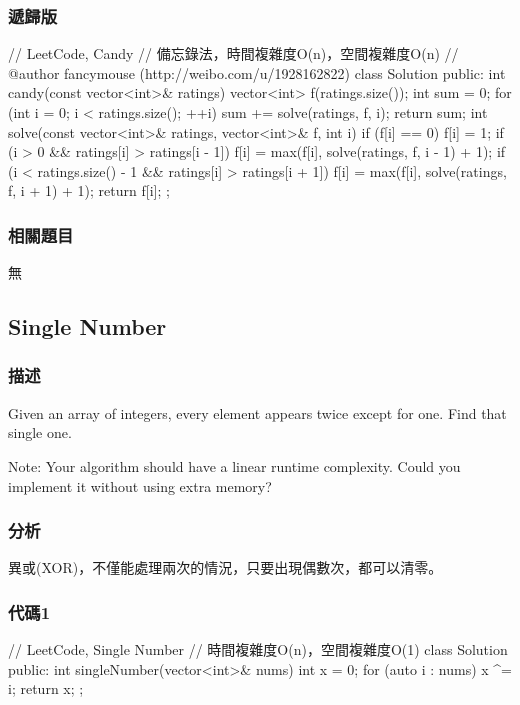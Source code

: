 \subsubsection{遞歸版}
\begin{Code}
// LeetCode, Candy
// 備忘錄法，時間複雜度O(n)，空間複雜度O(n)
// @author fancymouse (http://weibo.com/u/1928162822)
class Solution {
public:
    int candy(const vector<int>& ratings) {
        vector<int> f(ratings.size());
        int sum = 0;
        for (int i = 0; i < ratings.size(); ++i)
            sum += solve(ratings, f, i);
        return sum;
    }
    int solve(const vector<int>& ratings, vector<int>& f, int i) {
        if (f[i] == 0) {
            f[i] = 1;
            if (i > 0 && ratings[i] > ratings[i - 1])
                f[i] = max(f[i], solve(ratings, f, i - 1) + 1);
            if (i < ratings.size() - 1 && ratings[i] > ratings[i + 1])
                f[i] = max(f[i], solve(ratings, f, i + 1) + 1);
        }
        return f[i];
    }
};
\end{Code}


\subsubsection{相關題目}
\begindot
\item 無
\myenddot


\subsection{Single Number} %
\label{sec:single-number}


\subsubsection{描述}
Given an array of integers, every element appears twice except for one. Find that single one.

Note:
Your algorithm should have a linear runtime complexity. Could you implement it without using extra memory?


\subsubsection{分析}
異或(XOR)，不僅能處理兩次的情況，只要出現偶數次，都可以清零。


\subsubsection{代碼1}
\begin{Code}
// LeetCode, Single Number
// 時間複雜度O(n)，空間複雜度O(1)
class Solution {
public:
    int singleNumber(vector<int>& nums) {
        int x = 0;
        for (auto i : nums) {
            x ^= i;
        }
        return x;
    }
};
\end{Code}


